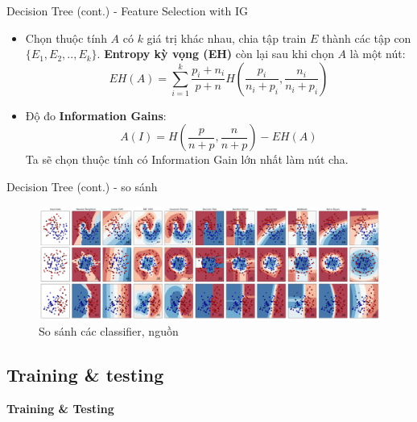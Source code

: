\documentclass[aspectratio=169,xcolor=dvipsnames]{beamer}
\begin{document}
\begin{frame}{Decision Tree (cont.) - Feature Selection with IG}
\begin{itemize}
\item Chọn thuộc tính $A$ có $k$ giá trị khác nhau, chia tập train $E$ thành các tập con $\{E_1, E_2, .., E_k\}$. \textbf{Entropy kỳ vọng (EH)} còn lại sau khi chọn $A$ là một nút:
$$
EH(A) = \sum_{i = 1}^{k} \frac{p_i + n_i}{p + n} H\left(\frac{p_i}{n_i + p_i}, \frac{n_i}{n_i + p_i}\right)
$$
\item Độ đo \textbf{Information Gains}:
$$
A(I) = H\left(\frac{p}{n + p}, \frac{n}{n + p}\right) - EH(A)
$$
Ta sẽ chọn thuộc tính có Information Gain lớn nhất làm nút cha.
\end{itemize}
\end{frame}

\begin{frame}{Decision Tree (cont.) - so sánh}
    \begin{figure}
        \centering
        \includegraphics[scale=.2]{img/classifiers-comparison.png}
        \caption{So sánh các classifier, nguồn \cite{scikit-learn}}
    \end{figure}
\end{frame}

\subsection{Training \& testing}

\begin{frame}
	\Huge{\centerline{\textbf{Training \& Testing}}}
\end{frame}
\end{document}
